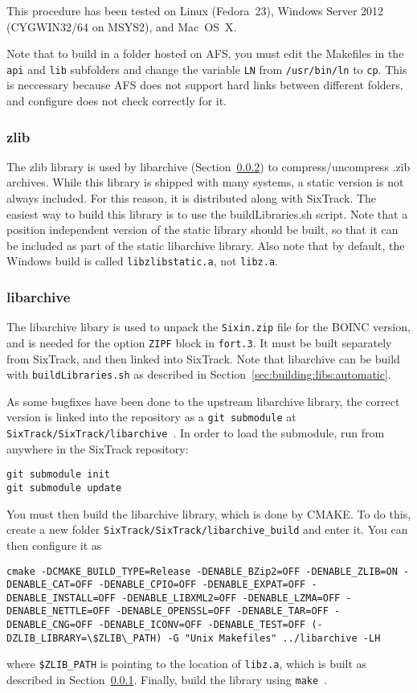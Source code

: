 \documentclass[english,BCOR=0mm,DIV=18]{scrartcl}
\begin{document}
This procedure has been tested on Linux (Fedora~23), Windows Server 2012 (CYGWIN32/64 on MSYS2), and Mac~OS~X.

Note that to build in a folder hosted on AFS, you must edit the Makefiles in the \texttt{api} and \texttt{lib} subfolders and change the variable \texttt{LN} from \texttt{/usr/bin/ln} to \texttt{cp}.
This is neccessary because AFS does not support hard links between different folders, and configure does not check correctly for it.

\subsubsection{zlib}
\label{sec:building:libs:zlib}
The zlib library is used by libarchive (Section~\ref{sec:building:libs:libarchive}) to compress/uncompress .zib archives.
While this library is shipped with many systems, a static version is not always included.
For this reason, it is distributed along with SixTrack.
The easiest way to build this library is to use the buildLibraries.sh script.
Note that a position independent version of the static library should be built, so that it can be included as part of the static libarchive library.
Also note that by default, the Windows build is called \texttt{libzlibstatic.a}, not \texttt{libz.a}.


\subsubsection{libarchive}
\label{sec:building:libs:libarchive}
The libarchive libary is used to unpack the \texttt{Sixin.zip} file for the BOINC version, and is needed for the option \texttt{ZIPF} block in \texttt{fort.3}.
It must be built separately from SixTrack, and then linked into SixTrack.
Note that libarchive can be build with \texttt{buildLibraries.sh} as described in Section~\ref{sec:building:libs:automatic}.

As some bugfixes have been done to the upstream libarchive library, the correct version is linked into the repository as a \texttt{git submodule}  at \texttt{SixTrack/SixTrack/libarchive}~.
In order to load the submodule, run from anywhere in the SixTrack repository:
\begin{lstlisting}
git submodule init
git submodule update
\end{lstlisting}

You must then build the libarchive library, which is done by CMAKE.
To do this, create a new folder \texttt{SixTrack/SixTrack/libarchive\_build} and enter it.
You can then configure it as 
\begin{lstlisting}
cmake -DCMAKE_BUILD_TYPE=Release -DENABLE_BZip2=OFF -DENABLE_ZLIB=ON -DENABLE_CAT=OFF -DENABLE_CPIO=OFF -DENABLE_EXPAT=OFF -DENABLE_INSTALL=OFF -DENABLE_LIBXML2=OFF -DENABLE_LZMA=OFF -DENABLE_NETTLE=OFF -DENABLE_OPENSSL=OFF -DENABLE_TAR=OFF -DENABLE_CNG=OFF -DENABLE_ICONV=OFF -DENABLE_TEST=OFF (-DZLIB_LIBRARY=\$ZLIB\_PATH) -G "Unix Makefiles" ../libarchive -LH
\end{lstlisting}
where \texttt{\$ZLIB\_PATH} is pointing to the location of \texttt{libz.a}, which is built as described in Section~\ref{sec:building:libs:zlib}.
Finally, build the library using \texttt{make}~.
\end{document}
